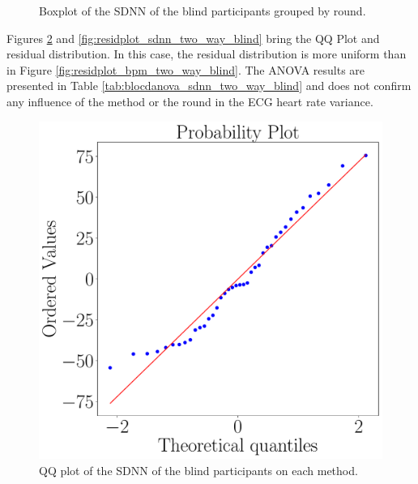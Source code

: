 \begin{figure}[!htb]
\begin{minipage}{0.45\textwidth}
        \caption{Boxplot of the SDNN of the blind participants grouped by round.}
        \label{fig:boxplot_ecg_sdnn_blind_rounds}
    \end{minipage}
\end{figure}


Figures \ref{fig:qqplot_sdnn_two_way_blind} and \ref{fig:residplot_sdnn_two_way_blind} bring the QQ Plot and residual distribution. In this case, the residual distribution is more uniform than in Figure \ref{fig:residplot_bpm_two_way_blind}. The ANOVA results are presented in Table \ref{tab:blocdanova_sdnn_two_way_blind} and does not confirm any influence of the method or the round in the ECG heart rate variance.

\begin{figure}[!htb]
    \centering
    \begin{minipage}{0.45\textwidth}
        \centering
        \includegraphics[width = 0.8\linewidth]{Resultados/ECG/Figuras/pdf/qqplot_sdnn_two_way_blind.pdf}
        \caption{QQ plot of the SDNN of the blind participants on each method.}
        \label{fig:qqplot_sdnn_two_way_blind}
    \end{minipage}
    \begin{minipage}{0.075\textwidth}
        \hfill
    \end{minipage}
    \begin{minipage}{0.45\textwidth}
        \centering

\end{minipage}
\end{figure}
